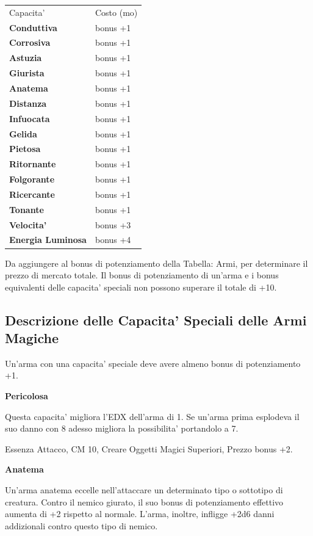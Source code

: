 \documentclass[a4paper,11pt,twoside,openany]{dndbook}
\begin{document}
{\label{tabella-capacita-speciali-delle-armi-a-distanza}

\begin{tabular}[c]{@{}ll@{}}
\toprule 
Capacita' & Costo (mo)\tabularnewline
\textbf{Conduttiva} \index{Conduttiva}& bonus +1\tabularnewline
\textbf{Corrosiva}\index{Corrosiva} & bonus +1\tabularnewline
\textbf{Astuzia} \index{Astuzia} & bonus +1\tabularnewline
\textbf{Giurista}\index{Giurista} & bonus +1\tabularnewline
\textbf{Anatema} \index{Anatema} & bonus +1\tabularnewline
\textbf{Distanza}\index{Distanza} & bonus +1\tabularnewline
\textbf{Infuocata}\index{Infuocata} & bonus +1\tabularnewline
\textbf{Gelida} \index{Gelida}& bonus +1\tabularnewline
\textbf{Pietosa} \index{Pietosa}& bonus +1\tabularnewline
\textbf{Ritornante} \index{Ritornante}& bonus +1\tabularnewline
\textbf{Folgorante}\index{Folgorante} & bonus +1\tabularnewline
\textbf{Ricercante} \index{Ricercante} & bonus +1\tabularnewline
\textbf{Tonante} \index{Tonante}& bonus +1\tabularnewline
\textbf{Velocita'} \index{Velocita'} & bonus +3\tabularnewline
\textbf{Energia Luminosa}\index{Energia Luminosa} & bonus +4\tabularnewline
\bottomrule
\end{tabular}

\bigskip

Da aggiungere al bonus di potenziamento della Tabella: Armi, per determinare
il prezzo di mercato totale. Il bonus di potenziamento di un'arma
e i bonus equivalenti delle capacita' speciali non possono superare
il totale di +10.

\subsection{Descrizione delle Capacita' Speciali delle Armi Magiche}

\label{descrizione-delle-capacita-speciali-delle-armi-magiche}

Un'arma con una capacita' speciale deve avere almeno bonus di potenziamento +1.

\textbf{Pericolosa}

Questa capacita' migliora l'EDX dell'arma di 1. Se un'arma prima esplodeva il suo danno con 8 adesso migliora la possibilita' portandolo a 7.

Essenza Attacco, CM 10, Creare Oggetti Magici Superiori, Prezzo bonus +2.

\textbf{Anatema}

Un'arma anatema eccelle nell'attaccare un determinato tipo o sottotipo di creatura. Contro il nemico giurato, il suo bonus di potenziamento effettivo aumenta di +2 rispetto al normale. L'arma, inoltre, infligge +2d6 danni addizionali contro questo tipo di nemico. 

}
\end{document}
